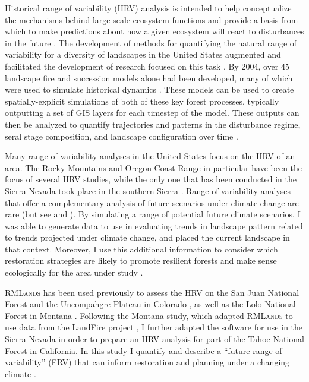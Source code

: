 Historical range of variability (HRV) analysis is intended to help conceptualize the mechanisms behind large-scale ecosystem functions and provide a basis from which to make predictions about how a given ecosystem will react to disturbances in the future \citep{Landres1999,Nonaka2005}. The development of methods for quantifying the natural range of variability for a diversity of landscapes in the United States augmented and facilitated the development of research focused on this task \citep{Landres1999}. By 2004, over 45 landscape fire and succession models alone had been developed, many of which were used to simulate historical dynamics \citep{Keane2004}. These models can be used to create spatially-explicit simulations of both of these key forest processes, typically outputting a set of GIS layers for each timestep of the model. These outputs can then be analyzed to quantify trajectories and patterns in the disturbance regime, seral stage composition, and landscape configuration over time \citep{Keane2004}. 

Many range of variability analyses in the United States focus on the HRV of an area. The Rocky Mountains and Oregon Coast Range in particular have been the focus of several HRV studies, while the only one that has been conducted in the Sierra Nevada took place in the southern Sierra \citep{Miller1999}. Range of variability analyses that offer a complementary analysis of future scenarios under climate change are rare (but see \cite{Keane2008} and \cite{Duveneck2014}). By simulating a range of potential future climate scenarios, I was able to generate data to use in evaluating trends in landscape pattern related to trends projected under climate change, and placed the current landscape in that context. Moreover, I use this additional information to consider which restoration strategies are likely to promote resilient forests and make sense ecologically for the area under study \citep{Duncan2010}.

\textsc{RMLands} has been used previously to assess the HRV on the San Juan National Forest and the Uncompahgre Plateau in Colorado \citep{McGarigal2005,McGarigal2005a,Romme2009}, as well as the Lolo National Forest in Montana \citep{Cushman2011}. Following the Montana study, which adapted \textsc{RMLands} to use data from the LandFire project \citep{Landfire2007}, I further adapted the software for use in the Sierra Nevada in order to prepare an HRV analysis for part of the Tahoe National Forest in California. In this study I quantify and describe a ``future range of variability'' (FRV) that can inform restoration and planning under a changing climate \citep{Fule2008,Duncan2010}. 





